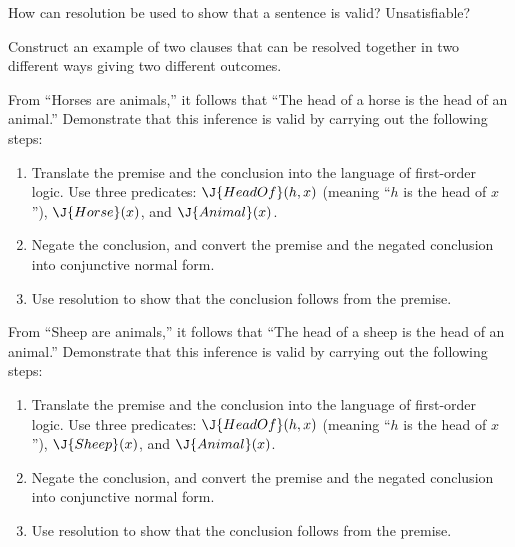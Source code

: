 \begin{exercise}
How can resolution be used to show that a sentence is valid? Unsatisfiable?
\end{exercise} 

\begin{exercise}
Construct an example of two clauses that can be resolved together in two 
different ways giving two different outcomes.
\end{exercise} 

\begin{uexercise}
From ``Horses are animals,'' it follows that ``The head of a horse is
the head of an animal.''  Demonstrate that this inference is valid by
carrying out the following steps: 
\begin{enumerate}
\item Translate the premise and the conclusion into the language of
first-order logic.  Use three predicates: \(\J{HeadOf}(h,x)\) (meaning ``\(h\) is the head of \(x\)''), \(\J{Horse}(x)\), and
\(\J{Animal}(x)\).
\item Negate the conclusion, and convert the premise and the negated
conclusion into conjunctive normal form.
\item Use resolution to show that the conclusion follows from the
premise.
\end{enumerate}
\end{uexercise} 

\begin{iexercise}
From ``Sheep are animals,'' it follows that ``The head of a sheep is
the head of an animal.''  Demonstrate that this inference is valid by
carrying out the following steps: 
\begin{enumerate}
\item Translate the premise and the conclusion into the language of
first-order logic.  Use three predicates: \(\J{HeadOf}(h,x)\) (meaning ``\(h\) is the head of \(x\)''), \(\J{Sheep}(x)\), and
\(\J{Animal}(x)\).
\item Negate the conclusion, and convert the premise and the negated
conclusion into conjunctive normal form.
\item Use resolution to show that the conclusion follows from the
premise.
\end{enumerate}
\end{iexercise} 

